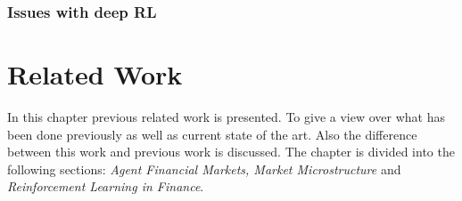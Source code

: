 \documentclass{kththesis}
\theoremstyle{definition}
\begin{document}

\newpage

\subsection{Issues with deep RL}





\chapter{Related Work}
In this chapter previous related work is presented. To give a view over what has been done previously as well as current state of the art. Also the difference between this work and previous work is discussed. The chapter is divided into the following sections: \textit{Agent Financial Markets, Market Microstructure} and \textit{Reinforcement Learning in Finance}.
\end{document}
